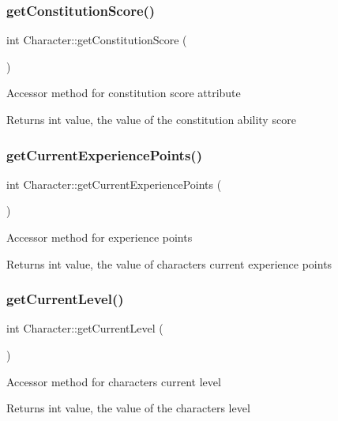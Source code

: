 \subsubsection{\texorpdfstring{get\+Constitution\+Score()}{getConstitutionScore()}}
{\footnotesize\ttfamily int Character\+::get\+Constitution\+Score (\begin{DoxyParamCaption}{ }\end{DoxyParamCaption})}

Accessor method for constitution score attribute \begin{DoxyReturn}{Returns}
int value, the value of the constitution ability score 
\end{DoxyReturn}
\hypertarget{class_character_a79ce6ccb3e7d78ea75905d8d3f2ba4e2}{}\label{class_character_a79ce6ccb3e7d78ea75905d8d3f2ba4e2} 
\subsubsection{\texorpdfstring{get\+Current\+Experience\+Points()}{getCurrentExperiencePoints()}}
{\footnotesize\ttfamily int Character\+::get\+Current\+Experience\+Points (\begin{DoxyParamCaption}{ }\end{DoxyParamCaption})}

Accessor method for experience points \begin{DoxyReturn}{Returns}
int value, the value of character\textquotesingle{}s current experience points 
\end{DoxyReturn}
\hypertarget{class_character_a9cf4ab6c7c066d38566773f946b64442}{}\label{class_character_a9cf4ab6c7c066d38566773f946b64442} 
\subsubsection{\texorpdfstring{get\+Current\+Level()}{getCurrentLevel()}}
{\footnotesize\ttfamily int Character\+::get\+Current\+Level (\begin{DoxyParamCaption}{ }\end{DoxyParamCaption})}

Accessor method for character\textquotesingle{}s current level \begin{DoxyReturn}{Returns}
int value, the value of the character\textquotesingle{}s level 
\end{DoxyReturn}
\hypertarget{class_character_a20ac6eab8a1df8ce849ad1015f656f96}{}\label{class_character_a20ac6eab8a1df8ce849ad1015f656f96} 
